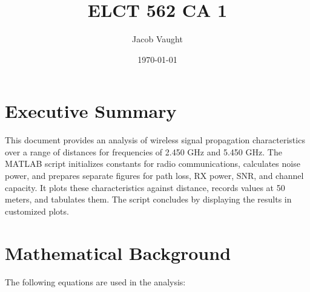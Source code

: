 \documentclass{article}
\begin{document}
\title{ELCT 562 CA 1}
\author{Jacob Vaught}
\date{\today}
\maketitle

\section*{Executive Summary}
This document provides an analysis of wireless signal propagation characteristics over a range of distances for frequencies of 2.450 GHz and 5.450 GHz. The MATLAB script initializes constants for radio communications, calculates noise power, and prepares separate figures for path loss, RX power, SNR, and channel capacity. It plots these characteristics against distance, records values at 50 meters, and tabulates them. The script concludes by displaying the results in customized plots.

\section*{Mathematical Background}
The following equations are used in the analysis:
\end{document}
